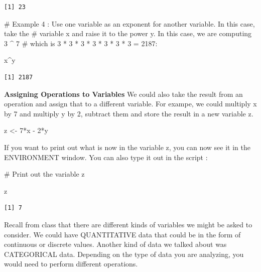 \documentclass[
  letterpaper,
  DIV=11,
  numbers=noendperiod]{scrreprt}
\newenvironment{Shaded}{\begin{snugshade}}{\end{snugshade}}
\newcommand{\CommentTok}[1]{\textcolor[rgb]{0.37,0.37,0.37}{#1}}
\newcommand{\DecValTok}[1]{\textcolor[rgb]{0.68,0.00,0.00}{#1}}
\newcommand{\NormalTok}[1]{\textcolor[rgb]{0.00,0.23,0.31}{#1}}
\newcommand{\OtherTok}[1]{\textcolor[rgb]{0.00,0.23,0.31}{#1}}
\newcommand{\SpecialCharTok}[1]{\textcolor[rgb]{0.37,0.37,0.37}{#1}}
\begin{document}
\begin{verbatim}
[1] 23
\end{verbatim}

\begin{Shaded}
\begin{Highlighting}[]
\CommentTok{\# Example 4 : Use one variable as an exponent for another variable. In this case, take the }
\CommentTok{\# variable x and raise it to the power y. In this case, we are computing 3 \^{} 7}
\CommentTok{\# which is 3 * 3 * 3 * 3 * 3 * 3 * 3 = 2187:}

\NormalTok{x}\SpecialCharTok{\^{}}\NormalTok{y}
\end{Highlighting}
\end{Shaded}

\begin{verbatim}
[1] 2187
\end{verbatim}

\textbf{Assigning Operations to Variables} We could also take the result
from an operation and assign that to a different variable. For exampe,
we could multiply x by 7 and multiply y by 2, subtract them and store
the result in a new variable z.

\begin{Shaded}
\begin{Highlighting}[]
\NormalTok{z }\OtherTok{\textless{}{-}} \DecValTok{7}\SpecialCharTok{*}\NormalTok{x }\SpecialCharTok{{-}} \DecValTok{2}\SpecialCharTok{*}\NormalTok{y}
\end{Highlighting}
\end{Shaded}

If you want to print out what is now in the variable z, you can now see
it in the ENVIRONMENT window. You can also type it out in the script :

\begin{Shaded}
\begin{Highlighting}[]
\CommentTok{\# Print out the variable z}

\NormalTok{z}
\end{Highlighting}
\end{Shaded}

\begin{verbatim}
[1] 7
\end{verbatim}

Recall from class that there are different kinds of variables we might
be asked to consider. We could have QUANTITATIVE data that could be in
the form of continuous or discrete values. Another kind of data we
talked about was CATEGORICAL data. Depending on the type of data you are
analyzing, you would need to perform different operations.
\end{document}
